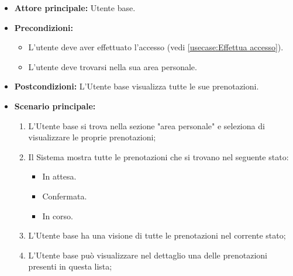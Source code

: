 \label{usecase:Visualizza prenotazioni}
\begin{itemize}
	\item \textbf{Attore principale:} Utente base.

	\item \textbf{Precondizioni:}
	\begin{itemize}
        \item L'utente deve aver effettuato l'accesso (vedi \autoref{usecase:Effettua accesso}).
        \item L'utente deve trovarsi nella sua area personale.
    \end{itemize}

	\item \textbf{Postcondizioni:} L'Utente base visualizza tutte le sue prenotazioni.

	\item \textbf{Scenario principale:}
	      \begin{enumerate}
		      \item L'Utente base si trova nella sezione "area personale" e seleziona di visualizzare le proprie prenotazioni;
		      \item Il Sistema mostra tutte le prenotazioni che si trovano nel seguente stato:
              \begin{itemize}
                \item In attesa.
                \item Confermata.
                \item In corso.
              \end{itemize}
              \item L'Utente base ha una visione di tutte le prenotazioni nel corrente stato;
              \item L'Utente base può visualizzare nel dettaglio una delle prenotazioni presenti in questa lista;
	      \end{enumerate}
\end{itemize}
